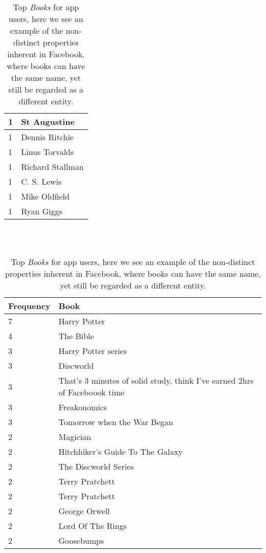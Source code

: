 \begin{table}[h]
\begin{minipage}[b]{.50\textwidth}
\begin{tabular}{|l|l|}
		1 & St Augustine \\ \hline
		1 & Dennis Ritchie \\ \hline
		1 & Linus Torvalds \\ \hline
		1 & Richard Stallman \\ \hline
		1 & C. S. Lewis \\ \hline
		1 & Mike Oldfield \\ \hline
		1 & Ryan Giggs \\ \hline
  \end{tabular}
  \caption{Top \emph{Inspirational People} for app users.}
\end{minipage}
\\
\\
\begin{minipage}[b]{1.0\textwidth}
\centering
  \begin{tabular}{|l|l|} %
  \hline
  	\textbf{Frequency} & \textbf{Book} \\ \hline
		7 & Harry Potter \\ \hline
		4 & The Bible \\ \hline
		3 & Harry Potter series \\ \hline
		3 & Discworld \\ \hline
		3 & That's 3 minutes of solid study, think I've earned 2hrs of Faceboook time \\ \hline
		3 & Freakonomics \\ \hline
		3 & Tomorrow when the War Began \\ \hline
		2 & Magician \\ \hline
		2 & Hitchhiker's Guide To The Galaxy \\ \hline
		2 & The Discworld Series \\ \hline
		2 & Terry Pratchett \\ \hline
		2 & Terry Pratchett \\ \hline
		2 & George Orwell \\ \hline
		2 & Lord Of The Rings \\ \hline
		2 & Goosebumps \\ \hline
  \end{tabular}
  \caption{Top \emph{Books} for app users, here we see an example of the non-distinct properties inherent in 
	Facebook, where books can have the same name, yet still be regarded as a different entity.}
\end{minipage}
\end{table}
